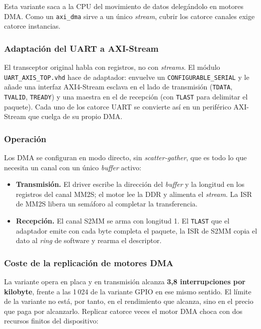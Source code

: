 Esta variante saca a la CPU del movimiento de datos delegándolo en motores DMA. Como un
\texttt{axi\_dma} sirve a un único \textit{stream}, cubrir los catorce canales exige catorce
instancias.

\subsubsection{Adaptación del UART a AXI-Stream}

El transceptor original habla con registros, no con \textit{streams}. El módulo
\texttt{UART\_AXIS\_TOP.vhd} hace de adaptador: envuelve un \texttt{CONFIGURABLE\_SERIAL} y le
añade una interfaz AXI4-Stream esclava en el lado de transmisión (\texttt{TDATA},
\texttt{TVALID}, \texttt{TREADY}) y una maestra en el de recepción (con \texttt{TLAST} para
delimitar el paquete). Cada uno de los catorce UART se convierte así en un periférico
AXI-Stream que cuelga de su propio DMA.

\subsubsection{Operación}

Los DMA se configuran en modo directo, sin \textit{scatter-gather}, que es todo lo que necesita
un canal con un único \textit{buffer} activo:

\begin{itemize}
    \item \textbf{Transmisión.} El driver escribe la dirección del \textit{buffer} y la longitud
    en los registros del canal MM2S; el motor lee la DDR y alimenta el \textit{stream}. La ISR
    de MM2S libera un semáforo al completar la transferencia.
    \item \textbf{Recepción.} El canal S2MM se arma con longitud 1. El \texttt{TLAST} que el
    adaptador emite con cada byte completa el paquete, la ISR de S2MM copia el dato al
    \textit{ring} de software y rearma el descriptor.
\end{itemize}

\subsubsection{Coste de la replicación de motores DMA}

La variante opera en placa y en transmisión alcanza \textbf{3,8 interrupciones por kilobyte}, frente
a las 1\,024 de la variante GPIO en ese mismo sentido. El límite de la variante no está, por tanto, en el rendimiento
que alcanza, sino en el precio que paga por alcanzarlo. Replicar catorce veces el motor DMA choca
con dos recursos finitos del dispositivo:

